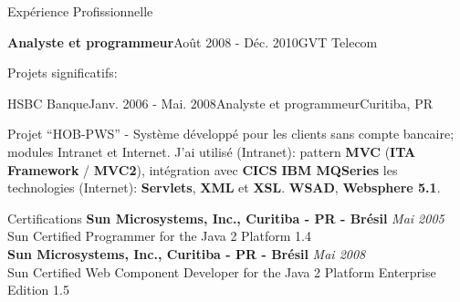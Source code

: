 \documentclass{resume}
\begin{document}
\begin{rSection}{Expérience Profissionnelle}
\begin{rSubsection}{\bf Analyste et programmeur}{Août 2008 - Déc. 2010}{GVT Telecom}{}
\begin{rSubsection}{Projets significatifs:}{}{}{}
      \end{rSubsection}
    \end{rSubsection}
    \begin{rSubsection}{HSBC Banque}{Janv. 2006 - Mai. 2008}{Analyste et programmeur}{Curitiba, PR}
    \item Projet “HOB-PWS” - Système développé pour les clients sans compte bancaire; modules Intranet et Internet. J’ai utilisé (Intranet): pattern \textbf{MVC} (\textbf{ITA Framework} / \textbf{MVC2}), intégration avec \textbf{CICS} \textbf{IBM MQSeries} les technologies (Internet): \textbf{Servlets}, \textbf{XML} et \textbf{XSL}. \textbf{WSAD}, \textbf{Websphere 5.1}.\\
    \end{rSubsection}
  \end{rSection}

  \begin{rSection}{Certifications}
    {\bf Sun Microsystems, Inc., Curitiba - PR - Brésil} \hfill {\em Mai 2005} \\ 
    {Sun Certified Programmer for the Java 2 Platform 1.4} \\

    {\bf Sun Microsystems, Inc., Curitiba - PR - Brésil} \hfill {\em Mai 2008} \\ 
    {Sun Certified Web Component Developer for the Java 2 Platform Enterprise Edition 1.5} \\
  \end{rSection}
  
\end{document}

